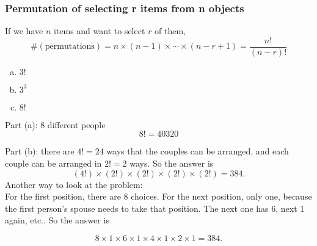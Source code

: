 \documentclass[slidestop,compress,mathserif]{beamer}
\begin{document}
\begin{frame}\frametitle{Permutation of selecting r items from n objects}
\begin{dinglist}{\DingListSymbolA}
\item If we have $n$ items and want to select $r$ of them,
\[
\#(\text{permutations}) = n \times (n-1) \times \cdots \times (n-r+1) = \frac{n!}{(n-r)!}
\]
\end{dinglist}

\begin{enumerate}[(a)]
\item $3! $
\item $3 ^ 3$
\item $8!$
\end{enumerate}


\vspace{1mm}

\end{frame}



\begin{frame}%

\pause
Part (a): 8 different people
\[8! = 40320\]
\pause

Part (b): there are $4!=24$ ways that the couples can be arranged, and each
couple can be arranged in $2! = 2$ ways.  So the answer is \pause
\[
(4!) \times (2!) \times (2!) \times (2!) \times (2!) = 384.
\]
\pause
Another way to look at the problem:\\

For the first position, there are 8 choices. For the next position, only one, because the first person's spouse needs to take that position. The next one has 6, next 1 again, etc.. So the answer is

$$ 8 \times 1 \times 6 \times 1 \times 4 \times 1 \times 2 \times 1 = 384.$$
\end{frame}
\end{document}
